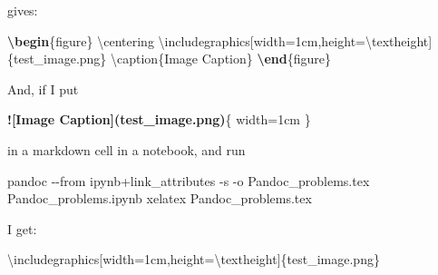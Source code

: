 \documentclass[
]{article}
\newenvironment{Shaded}{}{}
\newcommand{\AlertTok}[1]{\textcolor[rgb]{1.00,0.00,0.00}{\textbf{#1}}}
\newcommand{\AttributeTok}[1]{\textcolor[rgb]{0.49,0.56,0.16}{#1}}
\newcommand{\BuiltInTok}[1]{#1}
\newcommand{\ExtensionTok}[1]{#1}
\newcommand{\FunctionTok}[1]{\textcolor[rgb]{0.02,0.16,0.49}{#1}}
\newcommand{\KeywordTok}[1]{\textcolor[rgb]{0.00,0.44,0.13}{\textbf{#1}}}
\newcommand{\NormalTok}[1]{#1}
\begin{document}
gives:

\begin{Shaded}
\begin{Highlighting}[]
\KeywordTok{\textbackslash{}begin}\NormalTok{\{}\ExtensionTok{figure}\NormalTok{\}}
\FunctionTok{\textbackslash{}centering}
\BuiltInTok{\textbackslash{}includegraphics}\NormalTok{[width=1cm,height=}\FunctionTok{\textbackslash{}textheight}\NormalTok{]\{}\ExtensionTok{test\_image.png}\NormalTok{\}}
\FunctionTok{\textbackslash{}caption}\NormalTok{\{Image Caption\}}
\KeywordTok{\textbackslash{}end}\NormalTok{\{}\ExtensionTok{figure}\NormalTok{\}}
\end{Highlighting}
\end{Shaded}

And, if I put

\begin{Shaded}
\begin{Highlighting}[]
\AlertTok{![Image Caption](test\_image.png)}\NormalTok{\{ width=1cm \}}
\end{Highlighting}
\end{Shaded}

in a markdown cell in a notebook, and run

\begin{Shaded}
\begin{Highlighting}[]
\ExtensionTok{pandoc} \AttributeTok{{-}{-}from}\NormalTok{ ipynb+link\_attributes }\AttributeTok{{-}s} \AttributeTok{{-}o}\NormalTok{ Pandoc\_problems.tex Pandoc\_problems.ipynb}
\ExtensionTok{xelatex}\NormalTok{ Pandoc\_problems.tex}
\end{Highlighting}
\end{Shaded}

I get:

\begin{Shaded}
\begin{Highlighting}[]
\BuiltInTok{\textbackslash{}includegraphics}\NormalTok{[width=1cm,height=}\FunctionTok{\textbackslash{}textheight}\NormalTok{]\{}\ExtensionTok{test\_image.png}\NormalTok{\}}
\end{Highlighting}
\end{Shaded}
\end{document}
